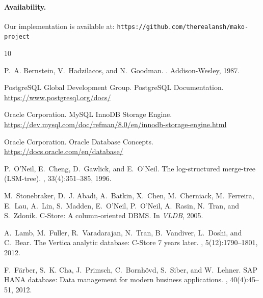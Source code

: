 \documentclass[letterpaper,twocolumn,10pt]{article}
\begin{document}
\paragraph{Availability.} Our implementation is available at: \texttt{https://github.com/therealansh/mako-project}


\begin{thebibliography}{10}

P.~A. Bernstein, V.~Hadzilacos, and N.~Goodman.
.
\newblock Addison-Wesley, 1987.

PostgreSQL Global Development Group.
\newblock PostgreSQL Documentation.
\newblock \url{https://www.postgresql.org/docs/}

Oracle Corporation.
\newblock MySQL InnoDB Storage Engine.
\newblock \url{https://dev.mysql.com/doc/refman/8.0/en/innodb-storage-engine.html}

Oracle Corporation.
\newblock Oracle Database Concepts.
\newblock \url{https://docs.oracle.com/en/database/}

P.~O'Neil, E.~Cheng, D.~Gawlick, and E.~O'Neil.
\newblock The log-structured merge-tree (LSM-tree).
, 33(4):351--385, 1996.

M.~Stonebraker, D.~J. Abadi, A.~Batkin, X.~Chen, M.~Cherniack, M.~Ferreira,
  E.~Lau, A.~Lin, S.~Madden, E.~O'Neil, P.~O'Neil, A.~Rasin, N.~Tran, and
  S.~Zdonik.
\newblock C-Store: A column-oriented DBMS.
\newblock In {\em VLDB}, 2005.

A.~Lamb, M.~Fuller, R.~Varadarajan, N.~Tran, B.~Vandiver, L.~Doshi, and
  C.~Bear.
\newblock The Vertica analytic database: C-Store 7 years later.
, 5(12):1790--1801, 2012.

F.~F{\"a}rber, S.~K. Cha, J.~Primsch, C.~Bornh{\"o}vd, S.~Siber, and W.~Lehner.
\newblock SAP HANA database: Data management for modern business applications.
, 40(4):45--51, 2012.

\end{thebibliography}
\end{document}
